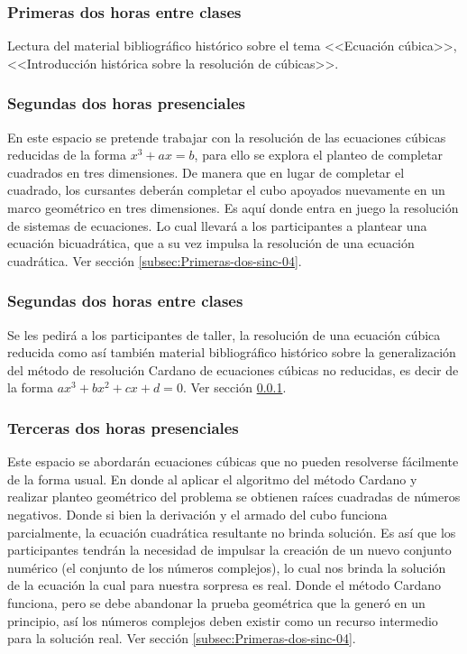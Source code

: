 \subsubsection{Primeras dos horas entre clases}\label{subsec:Primeras-dos-EC-04}

Lectura del material bibliográfico histórico sobre el tema <<Ecuación cúbica>>, <<Introducción histórica sobre la resolución de cúbicas>>.

\subsubsection{Segundas dos horas presenciales}

En este espacio se pretende trabajar con la resolución de las ecuaciones cúbicas reducidas de la forma $x^{3} + a x = b$, para ello se explora el planteo de completar cuadrados en tres dimensiones. De manera que en lugar de completar el cuadrado, los cursantes deberán completar el cubo apoyados nuevamente en un marco geométrico en tres dimensiones. Es aquí donde entra en juego la resolución de sistemas de ecuaciones. Lo cual llevará a los participantes a plantear una ecuación bicuadrática, que a su vez impulsa la resolución de una ecuación cuadrática. Ver sección \ref{subsec:Primeras-dos-sinc-04}.

\subsubsection{Segundas dos horas entre clases}

Se les pedirá a los participantes de taller, la resolución de una ecuación cúbica reducida como así también material bibliográfico histórico sobre la generalización del método de resolución Cardano de ecuaciones cúbicas no reducidas, es decir de la forma $a x^{3} + b x^{2} + c x + d = 0$. Ver sección \ref{subsec:Primeras-dos-EC-04}.

\subsubsection{Terceras dos horas presenciales}

Este espacio se abordarán ecuaciones cúbicas que no pueden resolverse fácilmente de la forma usual. En donde al aplicar el algoritmo del método Cardano y realizar planteo geométrico del problema se obtienen raíces cuadradas de números negativos. Donde si bien la derivación y el armado del cubo funciona parcialmente, la ecuación cuadrática resultante no brinda solución. Es así que los participantes tendrán la necesidad de impulsar la creación de un nuevo conjunto numérico (el conjunto de los números complejos), lo cual nos brinda la solución de la ecuación la cual para nuestra sorpresa es real. Donde el método Cardano funciona, pero se debe abandonar la prueba geométrica que la generó en un principio, así los números complejos deben existir como un recurso intermedio para la solución real. Ver sección \ref{subsec:Primeras-dos-sinc-04}.

